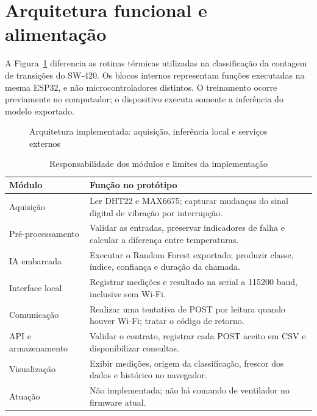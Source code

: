 \section{Arquitetura funcional e alimentação}
\label{sec:arquitetura}

A Figura~\ref{fig:arquitetura} diferencia as rotinas térmicas utilizadas na
classificação da contagem de transições do SW-420. Os blocos internos
representam funções executadas na mesma ESP32, e não microcontroladores
distintos. O treinamento ocorre previamente no computador; o dispositivo
executa somente a inferência do modelo exportado.

\begin{figure}[htbp]
\centering
\caption{Arquitetura implementada: aquisição, inferência local e serviços externos}
\label{fig:arquitetura}
\resizebox{\textwidth}{!}{}
\end{figure}

\begin{table}[htbp]
\centering
\caption{Responsabilidade dos módulos e limites da implementação}
\label{tab:modulos}
\small
\begin{tabularx}{\textwidth}{L{3cm}Y}
\toprule
Módulo & Função no protótipo\\
\midrule
Aquisição & Ler DHT22 e MAX6675; capturar mudanças do sinal digital de vibração por interrupção.\\
Pré-processamento & Validar as entradas, preservar indicadores de falha e calcular a diferença entre temperaturas.\\
IA embarcada & Executar o Random Forest exportado; produzir classe, índice, confiança e duração da chamada.\\
Interface local & Registrar medições e resultado na serial a 115200 baud, inclusive sem Wi-Fi.\\
Comunicação & Realizar uma tentativa de POST por leitura quando houver Wi-Fi; tratar o código de retorno.\\
API e armazenamento & Validar o contrato, registrar cada POST aceito em CSV e disponibilizar consultas.\\
Visualização & Exibir medições, origem da classificação, frescor dos dados e histórico no navegador.\\
Atuação & Não implementada; não há comando de ventilador no firmware atual.\\
\bottomrule
\end{tabularx}
\end{table}

